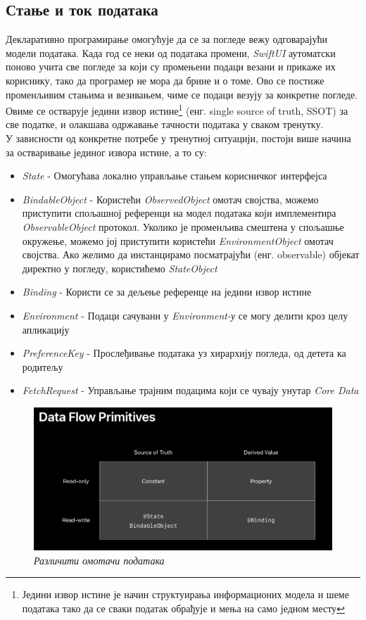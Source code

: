 \documentclass[12pt,oneside]{memoir}
\begin{document}
\subsection{Стање и ток података}

\indent Декларативно програмирање омогућује да се за погледе вежу одговарајући модели података. Када год се неки од података промени, \textit{SwiftUI} аутоматски поново учита све погледе за који су промењени подаци везани и прикаже их кориснику, тако да програмер не мора да брине и о томе. Ово се постиже променљивим стањима и везивањем, чиме се подаци везују за конкретне погледе. Овиме се остварује једини извор истине\footnote{Једини извор истине је начин структуирања информационих модела и шеме података тако да се сваки податак обрађује и мења на само једном месту} (енг. single source of truth, SSOT) за све податке, и олакшава одржавање тачности података у сваком тренутку. 
\\
\indent У зависности од конкретне потребе у тренутној ситуацији, постоји више начина за остваривање јединог извора истине, а то су:

\begin{itemize}
    \item \textit{State} - Омогућава локално управљање стањем корисничког интерфејса
    \item \textit{BindableObject} - Користећи \textit{ObservedObject} омотач својства, можемо приступити спољашној референци на модел података који имплементира \textit{ObservableObject} протокол. Уколико је променљива смештена у спољашње окружење, можемо јој приступити користећи \textit{EnvironmentObject} омотач својства. Ако желимо да инстанцирамо посматрајући (енг. observable) објекат директно у погледу, користићемо \textit{StateObject}
    \item \textit{Binding} - Користи се за дељење референце на једини извор истине
    \item \textit{Environment} - Подаци сачувани у \textit{Environment-у} се могу делити кроз целу апликацију
    \item \textit{PreferenceKey} - Прослеђивање података уз хирархију погледа, од детета ка родитељу
    \item \textit{FetchRequest} - Управљање трајним подацима који се чувају унутар \textit{Core Data}
\end{itemize}

\begin{figure}[H]
\includegraphics[width=1\textwidth]{images/DataFlowPrimitives.png}
\centering
\caption{\textit{Различити омотачи података}}
\label{slika:data_flow_primitives}
\end{figure}
\end{document}
